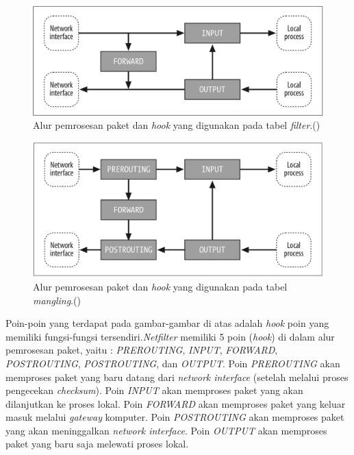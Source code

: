 \begin{figure}[H]
	\centering
	\includegraphics[width=\textwidth]{resources/filter_table.png}
	\caption{Alur pemrosesan paket dan \textit{hook} yang digunakan pada tabel \textit{filter}.(\cite{purdy2004linux})}
	\label{fig:packetflow_filter}
\end{figure}

\begin{figure}[H]
	\centering
	\includegraphics[width=\textwidth]{resources/mangling_table.png}
	\caption{Alur pemrosesan paket dan \textit{hook} yang digunakan pada tabel \textit{mangling}.(\cite{purdy2004linux})}
	\label{fig:packetflow_mangling}
\end{figure}

Poin-poin yang terdapat pada gambar-gambar di atas adalah \textit{hook} poin yang memiliki fungsi-fungsi tersendiri.\textit{Netfilter} memiliki 5 poin (\textit{hook}) di dalam alur pemrosesan paket, yaitu : \textit{PREROUTING}, \textit{INPUT}, \textit{FORWARD}, \textit{POSTROUTING}, \textit{POSTROUTING}, dan  \textit{OUTPUT}. 
Poin \textit{PREROUTING} akan memproses paket yang baru datang dari \textit{network interface} (setelah melalui proses pengecekan \textit{checksum}).
Poin \textit{INPUT} akan memproses paket yang akan dilanjutkan ke proses lokal.
Poin \textit{FORWARD} akan memproses paket yang keluar masuk melalui \textit{gateway} komputer.
Poin \textit{POSTROUTING} akan memproses paket yang akan meninggalkan \textit{network interface}.
Poin \textit{OUTPUT} akan memproses paket yang baru saja melewati proses lokal.



